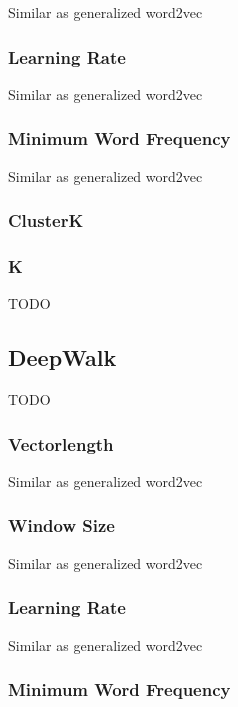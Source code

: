Similar as generalized word2vec

\subsubsection*{Learning Rate}

Similar as generalized word2vec

\subsubsection*{Minimum Word Frequency}

Similar as generalized word2vec

\subsubsection*{ClusterK}

\subsubsection*{K}

TODO

\subsection{DeepWalk}

TODO

\subsubsection*{Vectorlength}

Similar as generalized word2vec

\subsubsection*{Window Size}

Similar as generalized word2vec

\subsubsection*{Learning Rate}

Similar as generalized word2vec

\subsubsection*{Minimum Word Frequency}

